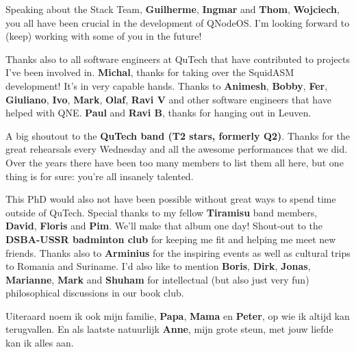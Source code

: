 Speaking about the Stack Team,
\textbf{Guilherme}, \textbf{Ingmar} and \textbf{Thom}, \textbf{Wojciech}, you all have been crucial in the development of QNodeOS.
I'm looking forward to (keep) working with some of you in the future!

Thanks also to all software engineers at QuTech that have contributed to projects I've been involved in.
\textbf{Michal}, thanks for taking over the SquidASM development! It's in very capable hands.
Thanks to \textbf{Animesh}, \textbf{Bobby}, \textbf{Fer}, \textbf{Giuliano}, \textbf{Ivo}, \textbf{Mark}, \textbf{Olaf}, \textbf{Ravi V} and other software engineers that have helped with QNE.
\textbf{Paul} and \textbf{Ravi B}, thanks for hanging out in Leuven.

A big shoutout to the \textbf{QuTech band (T2 stars, formerly Q2)}.
Thanks for the great rehearsals every Wednesday and all the awesome performances that we did.
Over the years there have been too many members to list them all here, but one thing is for sure: you're all insanely talented.

This PhD would also not have been possible without great ways to spend time outside of QuTech.
Special thanks to my fellow \textbf{Tiramisu} band members, \textbf{David}, \textbf{Floris} and \textbf{Pim}.
We'll make that album one day!
Shout-out to the \textbf{DSBA-USSR badminton club} for keeping me fit and helping me meet new friends.
Thanks also to \textbf{Arminius} for the inspiring events as well as cultural trips to Romania and Suriname.
I'd also like to mention \textbf{Boris}, \textbf{Dirk}, \textbf{Jonas}, \textbf{Marianne}, \textbf{Mark} and \textbf{Shuham} for intellectual (but also just very fun) philosophical discussions in our book club.

Uiteraard noem ik ook mijn familie, \textbf{Papa}, \textbf{Mama} en \textbf{Peter}, op wie ik altijd kan terugvallen.
En als laatste natuurlijk \textbf{Anne}, mijn grote steun, met jouw liefde kan ik alles aan.






